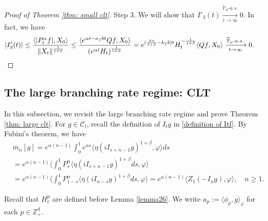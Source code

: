 \documentclass[12pt,a4paper]{amsart}
\theoremstyle{plain}
\theoremstyle{definition}
\numberwithin{equation}{section}
\begin{document}
\begin{proof}[Proof of Theorem \ref{thm: small clt}]
	Step 3. We will show that $I'_3(t) \xrightarrow[t\to \infty]{\widetilde {\mathbb P}_\mu \text{-} a.s.} 0$.
    In fact, we have
\begin{align}
	&|I'_3(t)|
     \leq \frac{\langle |P^\alpha_tf|,X_0\rangle}{\|X_t\|^{\frac{1}{1+\beta}}}
	\leq \frac{\langle e^{\alpha t - \kappa_f b t}Qf,X_0\rangle}{(e^{\alpha t} H_t)^{\frac{1}{1+\beta}}}
	= e^{(\frac{\beta \alpha }{1+\beta} - k_fb)t} H_t^{-\frac{1}{1+\beta}} \langle Qf,X_0\rangle
	\xrightarrow[t\to \infty]{\widetilde {\mathbb P}_\mu \text{-} a.s.} 0.
    \qedhere
\end{align}
\end{proof}
\subsection{The large branching rate regime: CLT}
\label{sec: large rate clt}
    In this subsection, we revisit the large branching rate regime and prove Theorem \ref{thm: large clt}.
    For $g\in \mathcal{C}_l$, recall the definition of $I_tg$ in \eqref{definition of Itf}.
    By Fubini's theorem, we have
\begin{align}\label{equ: transform of mn}
    &\bar{m}_n[g]=e^{\alpha(n-1)}\int_0^1 e^{\alpha s}\langle \eta(iI_{s+n-1}g)^{1+\beta}, \varphi\rangle ds
    \\    &
    =e^{\alpha(n-1)}\langle \int_0^1 P_s^{\alpha}\langle \eta(iI_{s+n-1}g)^{1+\beta}ds, \varphi\rangle\\
    &=e^{\alpha(n-1)}\langle \int_0^1 P_{1-s}^{\alpha}\langle \eta(iI_{n-s}g)^{1+\beta}ds, \varphi\rangle=e^{\alpha(n-1)}\langle Z_1(-I_ng),
    \varphi\rangle,
    \quad n\geq 1.
\end{align}

    Recall that $H^p_t$ are defined before Lemma \ref{lemma26}. We write $a_p:= \langle \phi_p, g\rangle_\varphi$ for each $p \in \mathbb Z_+^d$.
\end{document}
